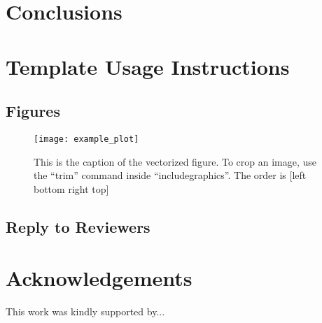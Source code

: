 \documentclass[journal]{IEEEtran}
\begin{document}
\section{Conclusions}
\label{sec_conclusions}

\section{Template Usage Instructions}
\subsection{Figures} \label{sec_figures}


\begin{figure}[t] %
     \centering
     \texttt{[image: example\_plot]}
     \caption{This is the caption of the vectorized figure. To crop an image, use the ``trim'' command inside ``includegraphics''. The order is [left bottom right top]}
     \label{fig_MyLabel}
  \end{figure}

\subsection{Reply to Reviewers}\label{sec_reply}


\section*{Acknowledgements}
This work was kindly supported by... 










\vfill



\newpage
\vfill
\end{document}
